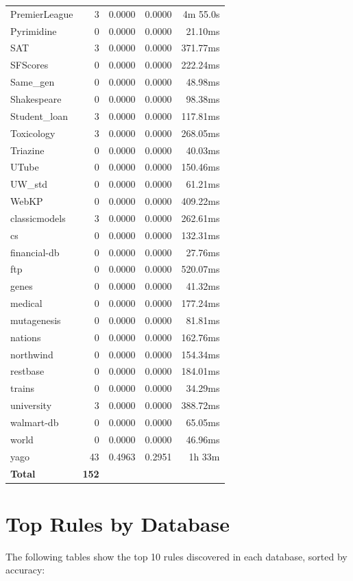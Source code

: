 \documentclass[11pt,a4paper]{article}
\begin{document}
\begin{table}[h!]
\begin{tabular}{|l|r|r|r|r|}
PremierLeague & 3 & 0.0000 & 0.0000 & 4m 55.0s \\
Pyrimidine & 0 & 0.0000 & 0.0000 & 21.10ms \\
SAT & 3 & 0.0000 & 0.0000 & 371.77ms \\
SFScores & 0 & 0.0000 & 0.0000 & 222.24ms \\
Same_gen & 0 & 0.0000 & 0.0000 & 48.98ms \\
Shakespeare & 0 & 0.0000 & 0.0000 & 98.38ms \\
Student_loan & 3 & 0.0000 & 0.0000 & 117.81ms \\
Toxicology & 3 & 0.0000 & 0.0000 & 268.05ms \\
Triazine & 0 & 0.0000 & 0.0000 & 40.03ms \\
UTube & 0 & 0.0000 & 0.0000 & 150.46ms \\
UW_std & 0 & 0.0000 & 0.0000 & 61.21ms \\
WebKP & 0 & 0.0000 & 0.0000 & 409.22ms \\
classicmodels & 3 & 0.0000 & 0.0000 & 262.61ms \\
cs & 0 & 0.0000 & 0.0000 & 132.31ms \\
financial-db & 0 & 0.0000 & 0.0000 & 27.76ms \\
ftp & 0 & 0.0000 & 0.0000 & 520.07ms \\
genes & 0 & 0.0000 & 0.0000 & 41.32ms \\
medical & 0 & 0.0000 & 0.0000 & 177.24ms \\
mutagenesis & 0 & 0.0000 & 0.0000 & 81.81ms \\
nations & 0 & 0.0000 & 0.0000 & 162.76ms \\
northwind & 0 & 0.0000 & 0.0000 & 154.34ms \\
restbase & 0 & 0.0000 & 0.0000 & 184.01ms \\
trains & 0 & 0.0000 & 0.0000 & 34.29ms \\
university & 3 & 0.0000 & 0.0000 & 388.72ms \\
walmart-db & 0 & 0.0000 & 0.0000 & 65.05ms \\
world & 0 & 0.0000 & 0.0000 & 46.96ms \\
yago & 43 & 0.4963 & 0.2951 & 1h 33m \\
\hline
\textbf{Total} & \textbf{152} & & & \\
\hline
\end{tabular}
\end{table}

\section{Top Rules by Database}
The following tables show the top 10 rules discovered in each database, sorted by accuracy:
\end{document}
